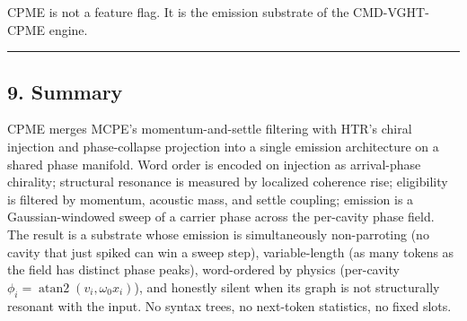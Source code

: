 \documentclass[
  11pt,
  a4paper,
]{article}
\begin{document}
CPME is not a feature flag. It is the emission substrate of the
CMD-VGHT-CPME engine.

\begin{center}\rule{0.5\linewidth}{0.5pt}\end{center}

\subsection{9. Summary}\label{summary}

CPME merges MCPE's momentum-and-settle filtering with HTR's chiral
injection and phase-collapse projection into a single emission
architecture on a shared phase manifold. Word order is encoded on
injection as arrival-phase chirality; structural resonance is measured
by localized coherence rise; eligibility is filtered by momentum,
acoustic mass, and settle coupling; emission is a Gaussian-windowed
sweep of a carrier phase across the per-cavity phase field. The result
is a substrate whose emission is simultaneously non-parroting (no cavity
that just spiked can win a sweep step), variable-length (as many tokens
as the field has distinct phase peaks), word-ordered by physics
(per-cavity \(\phi_i = \operatorname{atan2}(v_i, \omega_0 x_i)\)), and
honestly silent when its graph is not structurally resonant with the
input. No syntax trees, no next-token statistics, no fixed slots.
\end{document}
